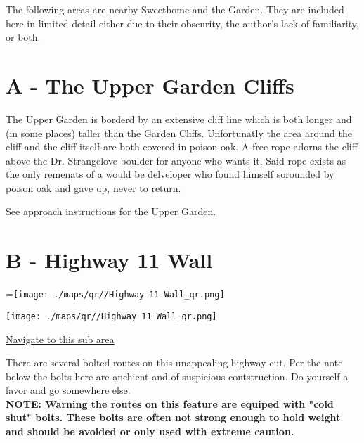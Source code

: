 \raggedcolumns
\begin{multicols}{2}


The following areas are nearby Sweethome and the Garden. They are included here in limited detail either due to their obscurity, the author's lack of familiarity, or both.\\



\needspace{6em}

\section{A - The Upper Garden Cliffs}\label{sa:The Upper Garden Cliffs}

The Upper Garden is borderd by an extensive cliff line which is both longer and (in some places) taller than the Garden Cliffs. Unfortunatly the area around the cliff and the cliff itself are both covered in poison oak. A free rope adorns the cliff above the Dr. Strangelove boulder for anyone who wants it. Said rope exists as the only remenats of a would be delveloper who found himself sorounded by poison oak and gave up, never to return.

See approach instructions for the Upper Garden.\\




\vfill\null
\columnbreak

\section{B - Highway 11 Wall}\label{sa:Highway 11 Wall}
=\hbox{\texttt{[image: ./maps/qr//Highway 11 Wall\_qr.png]}}%
\begin{center}
\texttt{[image: ./maps/qr//Highway 11 Wall\_qr.png]}
\end{center}
\begin{center}
\underline{\textcolor{blue}{\href{http://maps.google.com/maps?q=44.45543296270457,-122.54719340682593}{Navigate to this sub area}}}
\end{center}


There are several bolted routes on this unappealing highway cut. Per the note below the bolts here are anchient and of suspicious contstruction. Do yourself a favor and go somewhere else.\\
\textbf{NOTE: Warning the routes on this feature are equiped with "cold shut" bolts. These bolts are often not strong enough to hold weight and should be avoided or only used with extreme caution.}\\





\end{multicols}
